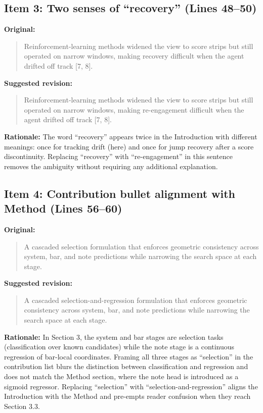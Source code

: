 \documentclass{article}
\begin{document}
\subsection*{Item 3: Two senses of ``recovery'' (Lines 48--50)}

\textbf{Original:}
\begin{quote}
Reinforcement-learning methods widened the view to score strips but still operated on narrow windows, making recovery difficult when the agent drifted off track [7, 8].
\end{quote}

\textbf{Suggested revision:}
\begin{quote}
Reinforcement-learning methods widened the view to score strips but still operated on narrow windows, making re-engagement difficult when the agent drifted off track [7, 8].
\end{quote}

\textbf{Rationale:}
The word ``recovery'' appears twice in the Introduction with different meanings: once for tracking drift (here) and once for jump recovery after a score discontinuity. Replacing ``recovery'' with ``re-engagement'' in this sentence removes the ambiguity without requiring any additional explanation.

\subsection*{Item 4: Contribution bullet alignment with Method (Lines 56--60)}

\textbf{Original:}
\begin{quote}
A cascaded selection formulation that enforces geometric consistency across system, bar, and note predictions while narrowing the search space at each stage.
\end{quote}

\textbf{Suggested revision:}
\begin{quote}
A cascaded selection-and-regression formulation that enforces geometric consistency across system, bar, and note predictions while narrowing the search space at each stage.
\end{quote}

\textbf{Rationale:}
In Section 3, the system and bar stages are selection tasks (classification over known candidates) while the note stage is a continuous regression of bar-local coordinates. Framing all three stages as ``selection'' in the contribution list blurs the distinction between classification and regression and does not match the Method section, where the note head is introduced as a sigmoid regressor. Replacing ``selection'' with ``selection-and-regression'' aligns the Introduction with the Method and pre-empts reader confusion when they reach Section 3.3.
\end{document}
